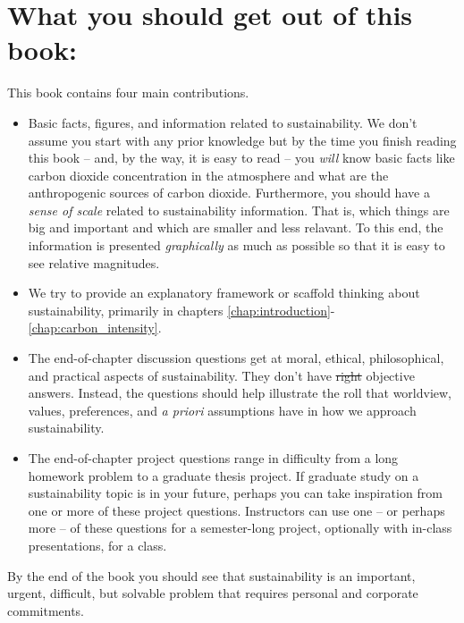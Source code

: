 {\section{What you should get out of this book:} This book contains four main 
contributions.
\begin{itemize}
\item Basic facts, figures, and information related to sustainability. We don't 
assume you start with any prior knowledge but by the time you finish reading this
book -- and, by the way, it is easy to read -- you \emph{will} know basic facts
like carbon dioxide concentration in the atmosphere and what are the anthropogenic
sources of carbon dioxide. Furthermore, you should have a \emph{sense of scale}
related to sustainability information. That is, which things are big and 
important and which are smaller and less relavant. To this end, the information
is presented \emph{graphically} as much as possible so that it is easy to see
relative magnitudes.
\item We try to provide an explanatory framework or scaffold thinking about sustainability,
primarily in chapters \ref{chap:introduction}-\ref{chap:carbon_intensity}.
\item The end-of-chapter discussion questions get at moral, ethical, philosophical,
and practical aspects of sustainability. They don't have \sout{right} objective 
answers. Instead, the questions should help illustrate the roll that worldview, 
values, preferences, and \emph{a priori} assumptions have in how we approach sustainability. 
\item The end-of-chapter project questions range in difficulty from a long
homework problem to a graduate thesis project. If graduate study on a sustainability
topic is in your future, perhaps you can take inspiration from one or more of 
these project questions. Instructors can use one -- or perhaps more -- of these 
questions for a semester-long project, optionally with in-class presentations, for a class.
\end{itemize}
By the end of the book you should see that sustainability is an important, 
urgent, difficult, but solvable problem that requires personal and corporate 
commitments. \\

}
